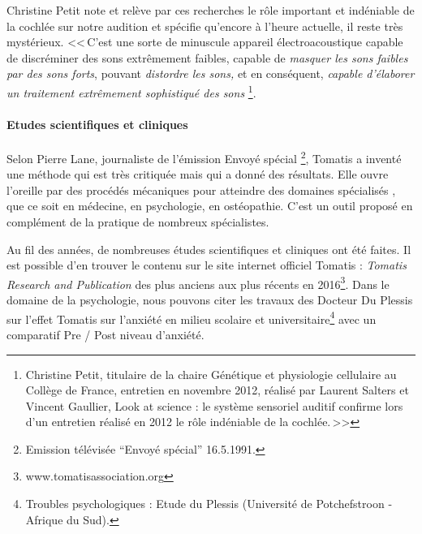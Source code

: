 Christine Petit note et relève par ces recherches le rôle important
et indéniable de la cochlée sur notre audition et spécifie qu'encore
à l'heure actuelle, il reste très mystérieux. 
<<\,C'est une sorte de minuscule appareil électroacoustique capable
de discréminer des sons extrêmement faibles, capable de \emph{masquer
les sons faibles par des sons forts}, pouvant \emph{distordre les
sons,} et en conséquent, \emph{capable d'élaborer un traitement extrêmement
sophistiqué des sons}%
\footnote{Christine Petit, titulaire de la chaire Génétique et
	physiologie cellulaire au Collège de France, entretien en novembre 2012, réalisé par Laurent Salters et Vincent Gaullier, Look at science : le système sensoriel auditif confirme lors d'un entretien réalisé en 2012 le rôle indéniable de la cochlée.\,>>}.


 \paragraph{Etudes scientifiques et cliniques}
 Selon Pierre Lane, journaliste de l'émission Envoyé spécial%
\footnote{Emission télévisée ``Envoyé spécial'' 16.5.1991.}, Tomatis
a inventé une méthode qui est très critiquée mais qui a donné des
résultats. Elle ouvre l'oreille par des procédés mécaniques pour atteindre
des domaines spécialisés , que ce soit en médecine, en psychologie,
en ostéopathie. C'est un outil proposé
en complément de la pratique de nombreux spécialistes. 

Au fil des années, de nombreuses études scientifiques et cliniques
ont été faites. Il est possible d'en trouver le contenu sur le site
internet officiel Tomatis : \emph{Tomatis Research and Publication}  des plus
anciens aux plus récents en 2016\footnote{www.tomatisassociation.org}.
Dans le domaine de la psychologie, nous pouvons citer les travaux des Docteur Du Plessis sur l'effet
Tomatis sur l'anxiété en milieu scolaire et universitaire\footnote{Troubles psychologiques : Etude du Plessis (Université de Potchefstroon
- Afrique du Sud).} avec un comparatif Pre / Post niveau d'anxiété.


